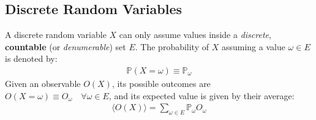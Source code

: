 \documentclass[../template.tex]{subfiles}
\begin{document}
\subsection{Discrete Random Variables}
A discrete random variable $X$ can only assume values inside a \textit{discrete}, \textbf{countable} (or \textit{denumerable}) set $E$. The probability of $X$ assuming a value $\omega \in E$ is denoted by:
\begin{align*}
    \mathbb{P}(X=\omega) \equiv \mathbb{P}_\omega
\end{align*}
Given an observable $O(X)$, its possible outcomes are $O(X=\omega) \equiv O_\omega\quad \forall \omega \in E$, and its expected value is given by their average:
\begin{align*}
    \langle O(X) \rangle = \sum_{\omega \in E} \mathbb{P}_\omega O_\omega
\end{align*}
\end{document}
